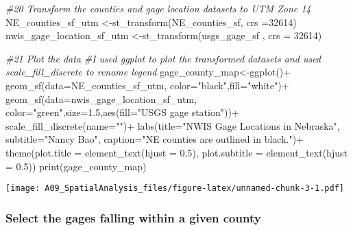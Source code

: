\documentclass[
]{article}
\newenvironment{Shaded}{\begin{snugshade}}{\end{snugshade}}
\newcommand{\AttributeTok}[1]{\textcolor[rgb]{0.77,0.63,0.00}{#1}}
\newcommand{\CommentTok}[1]{\textcolor[rgb]{0.56,0.35,0.01}{\textit{#1}}}
\newcommand{\DecValTok}[1]{\textcolor[rgb]{0.00,0.00,0.81}{#1}}
\newcommand{\FloatTok}[1]{\textcolor[rgb]{0.00,0.00,0.81}{#1}}
\newcommand{\FunctionTok}[1]{\textcolor[rgb]{0.00,0.00,0.00}{#1}}
\newcommand{\NormalTok}[1]{#1}
\newcommand{\OtherTok}[1]{\textcolor[rgb]{0.56,0.35,0.01}{#1}}
\newcommand{\SpecialCharTok}[1]{\textcolor[rgb]{0.00,0.00,0.00}{#1}}
\newcommand{\StringTok}[1]{\textcolor[rgb]{0.31,0.60,0.02}{#1}}
\begin{document}
\begin{Shaded}
\begin{Highlighting}[]
\CommentTok{\#20 Transform the counties and gage location datasets to UTM Zone 14}
\NormalTok{NE\_counties\_sf\_utm }\OtherTok{\textless{}{-}}\FunctionTok{st\_transform}\NormalTok{(NE\_counties\_sf, }\AttributeTok{crs =}\DecValTok{32614}\NormalTok{)}
\NormalTok{nwis\_gage\_location\_sf\_utm }\OtherTok{\textless{}{-}}\FunctionTok{st\_transform}\NormalTok{(usgs\_gage\_sf , }\AttributeTok{crs =} \DecValTok{32614}\NormalTok{)}

\CommentTok{\#21 Plot the data}
\CommentTok{\#I used ggplot to plot the transformed datasets and used scale\_fill\_discrete to rename legend}
\NormalTok{gage\_county\_map}\OtherTok{\textless{}{-}}\FunctionTok{ggplot}\NormalTok{()}\SpecialCharTok{+}
                  \FunctionTok{geom\_sf}\NormalTok{(}\AttributeTok{data=}\NormalTok{NE\_counties\_sf\_utm,}
                         \AttributeTok{color=}\StringTok{"black"}\NormalTok{,}\AttributeTok{fill=}\StringTok{"white"}\NormalTok{)}\SpecialCharTok{+}
                 \FunctionTok{geom\_sf}\NormalTok{(}\AttributeTok{data=}\NormalTok{nwis\_gage\_location\_sf\_utm,}
                         \AttributeTok{color=}\StringTok{"green"}\NormalTok{,}\AttributeTok{size=}\FloatTok{1.5}\NormalTok{,}\FunctionTok{aes}\NormalTok{(}\AttributeTok{fill=}\StringTok{"USGS gage station"}\NormalTok{))}\SpecialCharTok{+}
                 \FunctionTok{scale\_fill\_discrete}\NormalTok{(}\AttributeTok{name=}\StringTok{""}\NormalTok{)}\SpecialCharTok{+}
                 \FunctionTok{labs}\NormalTok{(}\AttributeTok{title=}\StringTok{"NWIS Gage Locations in Nebraska"}\NormalTok{,}
                                   \AttributeTok{subtitle=}\StringTok{"Nancy Bao"}\NormalTok{,}
                      \AttributeTok{caption=}\StringTok{"NE counties are outlined in black."}\NormalTok{)}\SpecialCharTok{+}
                \FunctionTok{theme}\NormalTok{(}\AttributeTok{plot.title =} \FunctionTok{element\_text}\NormalTok{(}\AttributeTok{hjust =} \FloatTok{0.5}\NormalTok{),}
                              \AttributeTok{plot.subtitle =} \FunctionTok{element\_text}\NormalTok{(}\AttributeTok{hjust =} \FloatTok{0.5}\NormalTok{))}
\FunctionTok{print}\NormalTok{(gage\_county\_map)}
\end{Highlighting}
\end{Shaded}

\texttt{[image: A09\_SpatialAnalysis\_files/figure-latex/unnamed-chunk-3-1.pdf]}

\hypertarget{select-the-gages-falling-within-a-given-county}{%
\subsubsection{Select the gages falling within a given
county}\label{select-the-gages-falling-within-a-given-county}}
\end{document}

